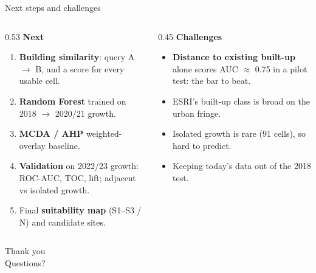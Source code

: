 \documentclass[aspectratio=169,11pt]{beamer}
\newcommand{\hl}[1]{\alert{\textbf{#1}}}
\begin{document}
\begin{frame}{Next steps and challenges}
  \small
  \begin{columns}[T]
    \begin{column}{0.53\textwidth}
      \textbf{Next}
      \begin{enumerate}
        \item \textbf{Building similarity}: query A $\rightarrow$ B, and a score for
              every usable cell.
        \item \textbf{Random Forest} trained on 2018 $\rightarrow$ 2020/21 growth.
        \item \textbf{MCDA / AHP} weighted-overlay baseline.
        \item \textbf{Validation} on 2022/23 growth: ROC-AUC, TOC, lift;
              adjacent vs isolated growth.
        \item Final \textbf{suitability map} (S1--S3 / N) and candidate sites.
      \end{enumerate}
    \end{column}
    \begin{column}{0.45\textwidth}
      \textbf{Challenges}
      \begin{itemize}
        \item \hl{Distance to existing built-up} alone scores AUC $\approx$ 0.75
              in a pilot test: the bar to beat.
        \item ESRI's built-up class is broad on the urban fringe.
        \item Isolated growth is rare (91 cells), so hard to predict.
        \item Keeping today's data out of the 2018 test.
      \end{itemize}
    \end{column}
  \end{columns}
\end{frame}

\begin{frame}[standout]
  Thank you\\[0.5em]
  \normalsize Questions?
\end{frame}
\end{document}
